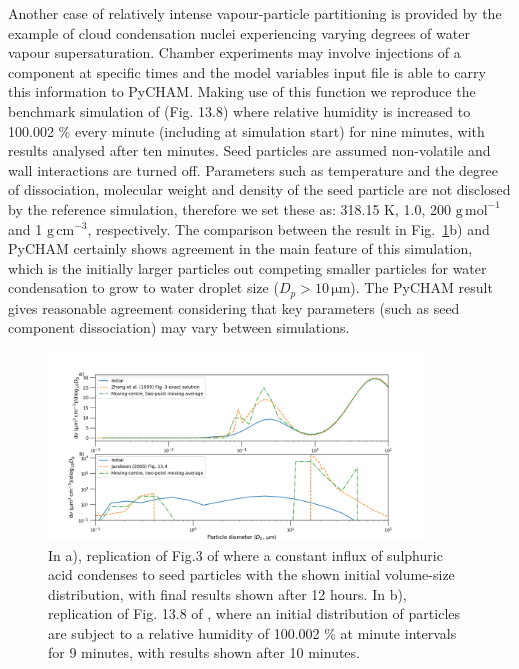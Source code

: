 \documentclass[gmd, manuscript]{copernicus}
\begin{document}
Another case of relatively intense vapour-particle partitioning is provided by the example of cloud condensation nuclei experiencing varying degrees of water vapour supersaturation.  Chamber experiments may involve injections of a component at specific times and the model variables input file is able to carry this information to PyCHAM.  Making use of this function we reproduce the benchmark simulation of \citet{Jacobson2005} (Fig. 13.8) where relative humidity is increased to 100.002 \% every minute (including at simulation start) for nine minutes, with results analysed after ten minutes.  Seed particles are assumed non-volatile and wall interactions are turned off.  Parameters such as temperature and the degree of dissociation, molecular weight and density of the seed particle are not disclosed by the reference simulation, therefore we set these as: 318.15 K, 1.0, 200 $\mathrm{g\,mol^{-1}}$ and 1 $\mathrm{g\,cm^{-3}}$, respectively.  The comparison between the \citet{Jacobson2005} result in Fig.~\ref{fig:mov_cen_test}b) and PyCHAM certainly shows agreement in the main feature of this simulation, which is the initially larger particles out competing smaller particles for water condensation to grow to water droplet size ($D_{p}>10\, \mathrm{\mu m}$).  The PyCHAM result gives reasonable agreement considering that key parameters (such as seed component dissociation) may vary between simulations.

\begin{figure}[t]
\includegraphics[width=10.0cm]{Results/mov_cen_test.png}
\caption{In a), replication of Fig.3 of \citet{Zhang1999} where a constant influx of sulphuric acid condenses to seed particles with the shown initial volume-size distribution, with final results shown after 12 hours.  In b), replication of Fig. 13.8 of \citet{Jacobson2005}, where an initial distribution of particles are subject to a relative humidity of 100.002 \% at minute intervals for 9 minutes, with results shown after 10 minutes.}
\label{fig:mov_cen_test}
\end{figure}
\end{document}
